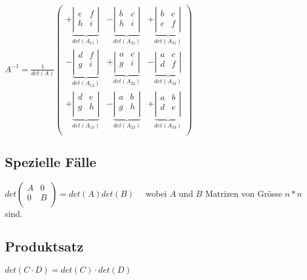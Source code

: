 		$A^{-1}=\displaystyle \frac{1}{det(A)}
			\left(\begin{array}{rrr} 
				+\underbrace{\left|\begin{array}{rr} e & f \\ h & i \\ \end{array}\right|}_{det(A_{11})} &
				-\underbrace{\left|\begin{array}{rr} b & c \\ h & i \\ \end{array}\right|}_{det(A_{21})} &
				+\underbrace{\left|\begin{array}{rr} b & c \\ e & f \\ \end{array}\right|}_{det(A_{31})} \\
			
				-\underbrace{\left|\begin{array}{rr} d & f \\ g & i \\ \end{array}\right|}_{det(A_{12})} &
				+\underbrace{\left|\begin{array}{rr} a & c \\ g & i \\ \end{array}\right|}_{det(A_{22})} &
				-\underbrace{\left|\begin{array}{rr} a & c \\ d & f \\ \end{array}\right|}_{det(A_{32})} \\
			
				+\underbrace{\left|\begin{array}{rr} d & e \\ g & h \\ \end{array}\right|}_{det(A_{13})} &
				-\underbrace{\left|\begin{array}{rr} a & b \\ g & h \\ \end{array}\right|}_{det(A_{23})} &
				+\underbrace{\left|\begin{array}{rr} a & b \\ d & e \\ \end{array}\right|}_{det(A_{33})} \\
			\end{array}\right)$			
\subsection{Spezielle Fälle}
	$det\left(\begin{array}{cc} 
			A & 0 \\
			0 & B \\
		\end{array}\right)=det(A)det(B)$ \ \ wobei $A$ und $B$ Matrizen von Grösse $n*n$ sind.
\subsection{Produktsatz}
$det(C \cdot D) = det(C) \cdot det(D)$